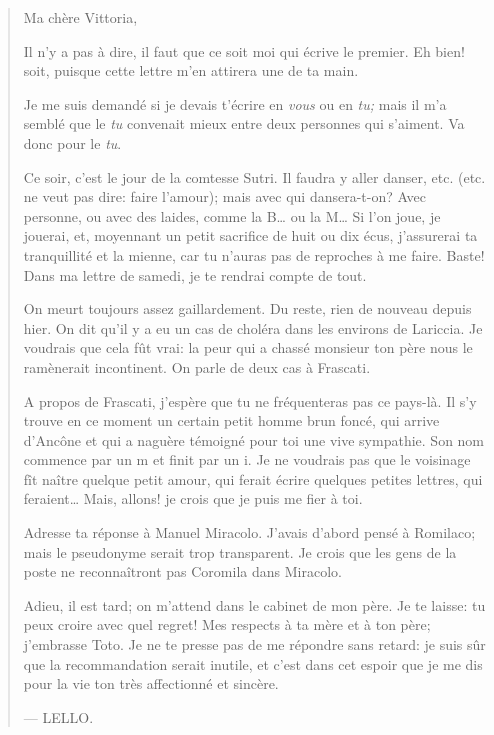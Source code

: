 \begin{quote}
Ma chère Vittoria,

Il n'y a pas à dire, il faut que ce soit moi qui écrive le premier. Eh
bien! soit, puisque cette lettre m'en attirera une de ta main.

Je me suis demandé si je devais t'écrire en \emph{vous} ou en \emph{tu;}
mais il m'a semblé que le \emph{tu} convenait mieux entre deux personnes
qui s'aiment. Va donc pour le \emph{tu}.

Ce soir, c'est le jour de la comtesse Sutri. Il faudra y aller danser,
etc. (etc. ne veut pas dire: faire l'amour); mais avec qui dansera-t-on?
Avec personne, ou avec des laides, comme la B\ldots{} ou la M\ldots{} Si
l'on joue, je jouerai, et, moyennant un petit sacrifice de huit ou dix
écus, j'assurerai ta tranquillité et la mienne, car tu n'auras pas de
reproches à me faire. Baste! Dans ma lettre de samedi, je te rendrai
compte de tout.

On meurt toujours assez gaillardement. Du reste, rien de nouveau depuis
hier. On dit qu'il y a eu un cas de choléra dans les environs de
Lariccia. Je voudrais que cela fût vrai: la peur qui a chassé monsieur
ton père nous le ramènerait incontinent. On parle de deux cas à
Frascati.

A propos de Frascati, j'espère que tu ne fréquenteras pas ce pays-là. Il
s'y trouve en ce moment un certain petit homme brun foncé, qui arrive
d'Ancône et qui a naguère témoigné pour toi une vive sympathie. Son nom
commence par un m et finit par un i. Je ne voudrais pas que le voisinage
fît naître quelque petit amour, qui ferait écrire quelques petites
lettres, qui feraient\ldots{} Mais, allons! je crois que je puis me fier
à toi.

Adresse ta réponse à Manuel Miracolo. J'avais d'abord pensé à Romilaco;
mais le pseudonyme serait trop transparent. Je crois que les gens de la
poste ne reconnaîtront pas Coromila dans Miracolo.

Adieu, il est tard; on m'attend dans le cabinet de mon père. Je te
laisse: tu peux croire avec quel regret! Mes respects à ta mère et à ton
père; j'embrasse Toto. Je ne te presse pas de me répondre sans retard:
je suis sûr que la recommandation serait inutile, et c'est dans cet
espoir que je me dis pour la vie ton très affectionné et sincère.

--- LELLO.
\end{quote}

